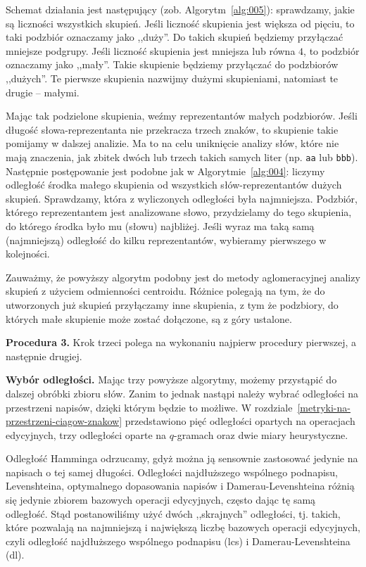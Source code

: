 \documentclass{praca1}
\begin{document}
Schemat działania jest następujący (zob. Algorytm~\ref{alg:005}): sprawdzamy, jakie są liczności wszystkich skupień. Jeśli liczność skupienia jest większa od pięciu, to taki podzbiór oznaczamy jako ,,duży''. Do takich skupień będziemy przyłączać mniejsze podgrupy. Jeśli liczność skupienia jest mniejsza lub równa $4$, to podzbiór oznaczamy jako ,,mały''. Takie skupienie będziemy przyłączać do podzbiorów ,,dużych''. Te pierwsze skupienia nazwijmy dużymi skupieniami, natomiast te drugie -- małymi. 

Mając tak podzielone skupienia, weźmy reprezentantów małych podzbiorów. Jeśli długość słowa-reprezentanta nie przekracza trzech znaków, to skupienie takie pomijamy w dalszej analizie. Ma to na celu uniknięcie analizy słów, które nie mają znaczenia, jak zbitek dwóch lub trzech takich samych liter (np. \verb|aa| lub \verb|bbb|). Następnie postępowanie jest podobne jak w Algorytmie~\ref{alg:004}: liczymy odległość środka małego skupienia od wszystkich słów-reprezentantów dużych skupień. Sprawdzamy, która z wyliczonych odległości była najmniejsza. Podzbiór, którego reprezentantem jest analizowane słowo, przydzielamy do tego skupienia, do którego środka było mu (słowu) najbliżej. Jeśli wyraz ma taką samą (najmniejszą) odległość do kilku reprezentantów, wybieramy pierwszego w kolejności.

Zauważmy, że powyższy algorytm podobny jest do metody aglomeracyjnej analizy skupień z użyciem odmienności centroidu. Różnice polegają na tym, że do utworzonych już skupień przyłączamy inne skupienia, z tym że podzbiory, do których małe skupienie może zostać dołączone, są z góry ustalone.



\textbf{Procedura 3.} Krok trzeci polega na wykonaniu najpierw procedury pierwszej, a następnie drugiej.

\textbf{Wybór odległości.} Mając trzy powyższe algorytmy, możemy przystąpić do dalszej obróbki zbioru słów. Zanim to jednak nastąpi należy wybrać odległości na przestrzeni napisów, dzięki którym będzie to możliwe. W rozdziale~\ref{metryki-na-przestrzeni-ciagow-znakow} przedstawiono pięć odległości opartych na operacjach edycyjnych, trzy odległości oparte na $q$-gramach oraz dwie miary heurystyczne. 

Odległość Hamminga odrzucamy, gdyż można ją sensownie zastosować jedynie na napisach o tej samej długości. Odległości najdłuższego wspólnego podnapisu, Levenshteina, optymalnego dopasowania napisów i Damerau-Levenshteina różnią się jedynie zbiorem bazowych operacji edycyjnych, często dając tę samą odległość. Stąd postanowiliśmy użyć dwóch ,,skrajnych'' odległości, tj. takich, które pozwalają na najmniejszą i największą liczbę bazowych operacji edycyjnych, czyli odległość najdłuższego wspólnego podnapisu (lcs) i Damerau-Levenshteina (dl). 
\end{document}
